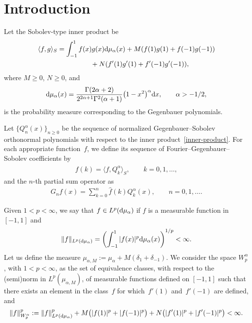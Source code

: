 \section{Introduction}

Let the Sobolev-type inner product be
\begin{gather}
\langle f,g \rangle_S=\int_{-1}^{1}f(x)g(x){\rm d}\mu_{\alpha}(x)+M(f(1)g(1)+f(-1)g(-1))\nonumber\\
\hphantom{\langle f,g \rangle_S=}{} +N(f'(1)g'(1)+f'(-1)g'(-1)),\label{inner-product}
\end{gather}
where $M\ge 0$, $N\ge 0$, and
\begin{gather*}
{\rm d}\mu_{\alpha}(x)=\frac{\Gamma(2\alpha+2)}{2^{2\alpha+1}\Gamma^2(\alpha+1)}\big(1-x^2\big)^{\alpha}{\rm d}x,\qquad \alpha>-1/2,
\end{gather*}
is the probability measure corresponding to the Gegenbauer polynomials.

Let $\{Q_n^{\alpha}(x)\}_{n\ge 0}$ be the sequence of normalized Gegenbauer--Sobolev orthonormal polynomials with respect to the inner product~\eqref{inner-product}. For each appropriate function~$f$, we define its sequence of Fourier--Gegenbauer--Sobolev coefficients by
\begin{gather*}
\widehat{f}(k)=\langle f, Q_k^{\alpha}\rangle_S, \qquad k=0,1,\dots,
\end{gather*}
and the $n$-th partial sum operator as
\begin{gather*}
G_nf(x)=\sum_{k=0}^n \widehat{f}(k) Q_k^{\alpha}(x), \qquad n=0,1,\dots.
\end{gather*}

Given $1< p<\infty$, we say that $f\in L^p({\rm d}\mu_{\alpha})$ if $f$ is a measurable function in~$[-1,1]$ and
\begin{gather*}
\|f\|_{L^p({\rm d}\mu_{\alpha})}=\left(\int_{-1}^1 |f(x)|^p {\rm d}\mu_{\alpha}(x)\right)^{1/p}<\infty.
\end{gather*}
Let us define the measure $\mu_{\alpha,M} := \mu_\alpha+M(\delta_1+\delta_{-1})$. We consider the space $W_p^{\alpha}$, with $1< p<\infty$, as the set of equivalence classes, with respect to the (semi)norm in $L^p(\mu_{\alpha,M})$, of measurable functions defined on $[-1,1]$ such that there exists an element in the class~$f$ for which~$f'(1)$ and~$f'(-1)$ are defined, and
\begin{gather*}
\|f\|_{W_p^{\alpha}}^p:=\|f\|_{L^p({\rm d}\mu_{\alpha})}^p+M\big(|f(1)|^p+|f(-1)|^p\big) +N\big(|f'(1)|^p+|f'(-1)|^p\big)<\infty.
\end{gather*}

